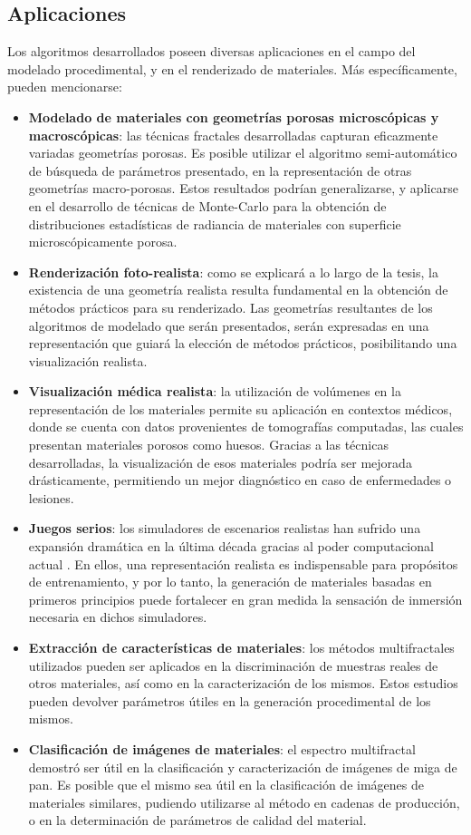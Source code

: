 \subsection{Aplicaciones}
Los algoritmos desarrollados poseen diversas aplicaciones en el campo del modelado procedimental, y en el renderizado de materiales.
Más específicamente, pueden mencionarse:

\begin{itemize}
\item {\bf Modelado de materiales con geometrías porosas microscópicas y macroscópicas}: las técnicas fractales desarrolladas capturan eficazmente variadas geometrías porosas. Es posible utilizar el algoritmo semi-automático de búsqueda de parámetros presentado, en la representación de otras geometrías macro-porosas. Estos resultados podrían generalizarse, y aplicarse en el desarrollo de técnicas de Monte-Carlo para la obtención de distribuciones estadísticas de radiancia de materiales con superficie microscópicamente porosa.
\item {\bf Renderización foto-realista}: como se explicará a lo largo de la tesis, la existencia de una geometría realista resulta fundamental en la obtención de métodos prácticos para su renderizado. Las geometrías resultantes de los algoritmos de modelado que serán presentados, serán expresadas en una representación que guiará la elección de métodos prácticos, posibilitando una visualización realista.
\item {\bf Visualización médica realista}: la utilización de volúmenes en la representación de los materiales permite su aplicación en contextos médicos, donde se cuenta con datos provenientes de tomografías computadas, las cuales presentan materiales porosos como huesos. Gracias a las técnicas desarrolladas, la visualización de esos materiales podría ser mejorada drásticamente, permitiendo un mejor diagnóstico en caso de enfermedades o lesiones.
\item {\bf Juegos serios}: los simuladores de escenarios realistas han sufrido una expansión dramática en la última década gracias al poder computacional actual \cite{Susi2007}. En ellos, una representación realista es indispensable para propósitos de entrenamiento, y por lo tanto, la generación de materiales basadas en primeros principios puede fortalecer en gran medida la sensación de inmersión necesaria en dichos simuladores. 
\item {\bf Extracción de características de materiales}: los métodos multifractales utilizados pueden ser aplicados en la discriminación de muestras reales de otros materiales, así como en la caracterización de los mismos. Estos estudios pueden devolver parámetros útiles en la generación procedimental de los mismos.
\item  {\bf Clasificación de imágenes de materiales}: el espectro multifractal demostró ser útil en la clasificación y caracterización de imágenes de miga de pan. Es posible que el mismo sea útil en la clasificación de imágenes de materiales similares, pudiendo utilizarse al método en cadenas de producción, o en la determinación de parámetros de calidad del material.
\end{itemize}

